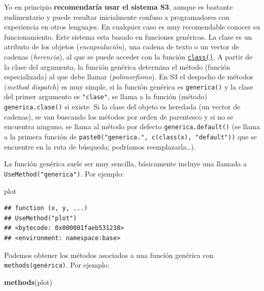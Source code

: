 \documentclass[
]{book}
\newenvironment{Shaded}{\begin{snugshade}}{\end{snugshade}}
\newcommand{\FunctionTok}[1]{\textcolor[rgb]{0.13,0.29,0.53}{\textbf{#1}}}
\newcommand{\NormalTok}[1]{#1}
\theoremstyle{break}
\theoremstyle{nonumberplain}
\begin{document}
Yo en principio \textbf{recomendaría usar el sistema S3}, aunque es bastante rudimentario y puede resultar inicialmente confuso a programadores con experiencia en otros lenguajes.
En cualquier caso es muy recomendable conocer su funcionamiento.
Este sistema esta basado en funciones genéricas.
La clase es un atributo de los objetos (\emph{encapsulación}), una cadena de texto o un vector de cadenas (\emph{herencia}), al que se puede acceder con la función \href{https://rdrr.io/r/base/class.html}{\texttt{class()}}.
A partir de la clase del argumento, la función genérica determina el método (función especializada) al que debe llamar (\emph{polimorfismo}).
En S3 el despacho de métodos (\emph{method dispatch}) es muy simple, si la función genérica es \texttt{generica()} y la clase del primer argumento es \texttt{"clase"}, se llama a la función (método) \texttt{generica.clase()} si existe.
Si la clase del objeto es heredada (un vector de cadenas), se van buscando los métodos por orden de parentesco y si no se encuentra ninguno, se llama al método por defecto \texttt{generica.default()} (se llama a la primera función de \texttt{paste0("generica.",\ c(class(x),\ "default"))} que se encuentre en la ruta de búsqueda; podríamos reemplazarla\ldots).

La función genérica suele ser muy sencilla, básicamente incluye una llamada a \texttt{UseMethod("generica")}.
Por ejemplo:

\begin{Shaded}
\begin{Highlighting}[]
\NormalTok{plot}
\end{Highlighting}
\end{Shaded}

\begin{verbatim}
## function (x, y, ...) 
## UseMethod("plot")
## <bytecode: 0x000001faeb531238>
## <environment: namespace:base>
\end{verbatim}

Podemos obtener los métodos asociados a una función genérica con \texttt{methods(genérica)}.
Por ejemplo:

\begin{Shaded}
\begin{Highlighting}[]
\FunctionTok{methods}\NormalTok{(plot)}
\end{Highlighting}
\end{Shaded}
\end{document}
